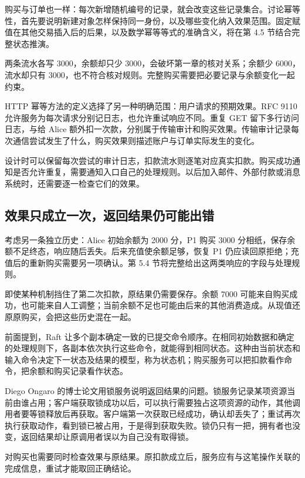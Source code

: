 

购买与订单也一样：每次新增随机编号的记录，就会改变这些记录集合。讨论幂等性，首先要说明新建对象怎样保持同一身份，以及哪些变化纳入效果范围。固定赋值在其他交易插入后的后果，以及数学幂等等式的准确含义，将在第 4.5 节结合完整状态推演。

两条流水各写 3000，余额却只少 3000，会破坏第一章的核对关系；余额少 6000，流水却只有 3000，也不符合核对规则。完整购买需要把必要记录与余额变化一起约束。

HTTP 幂等方法的定义选择了另一种明确范围：用户请求的预期效果。RFC 9110 允许服务为每次请求分别记日志，也允许重试响应不同\cite{http}。重复 GET 留下多行访问日志，与给 Alice 额外扣一次款，分别属于传输审计和购买效果。传输审计记录每次通信尝试发生了什么，购买效果则描述账户与订单实际发生的变化。

设计时可以保留每次尝试的审计日志，扣款流水则逐笔对应真实扣款。购买成功通知是否允许重复，需要通知入口自己的处理规则。以后加入邮件、外部付款或消息系统时，还需要逐一检查它们的效果。

\subsection*{效果只成立一次，返回结果仍可能出错}

考虑另一条独立历史：Alice 初始余额为 2000 分，P1 购买 3000 分相纸，保存余额不足终态，响应随后丢失。后来充值使余额足够，恢复 P1 仍应读回原拒绝；充值后的重新购买需要另一项确认。第 5.4 节将完整给出这两类响应的字段与处理规则。

即使某种机制挡住了第二次扣款，原结果仍需要保存。余额 7000 可能来自购买成功，也可能来自人工调整；当前余额不足也可能由后来的其他消费造成。从现值还原原购买，会把这些历史混在一起。

前面提到，Raft 让多个副本确定一致的已提交命令顺序。在相同初始数据和确定的处理规则下，各副本依次执行这些命令，就能得到相同状态。这种由当前状态和输入命令决定下一状态及结果的模型，称为状态机；购买服务可以把扣款看作命令，把余额和购买记录看作状态。

Diego Ongaro 的博士论文用锁服务说明返回结果的问题。锁服务记录某项资源当前由谁占用；客户端获取锁成功以后，可以执行需要独占这项资源的动作，其他调用者要等锁释放后再获取。客户端第一次获取已经成功，确认却丢失了；重试再次执行获取动作，看到锁已被占用，于是得到获取失败\cite{ongaro}。锁仍只有一把，拥有者也没变，返回结果却让原调用者误以为自己没有取得锁。



对购买也需要同时检查效果与原结果。原扣款成立后，服务应有与这笔操作关联的完成信息，重试才能取回正确结论。

